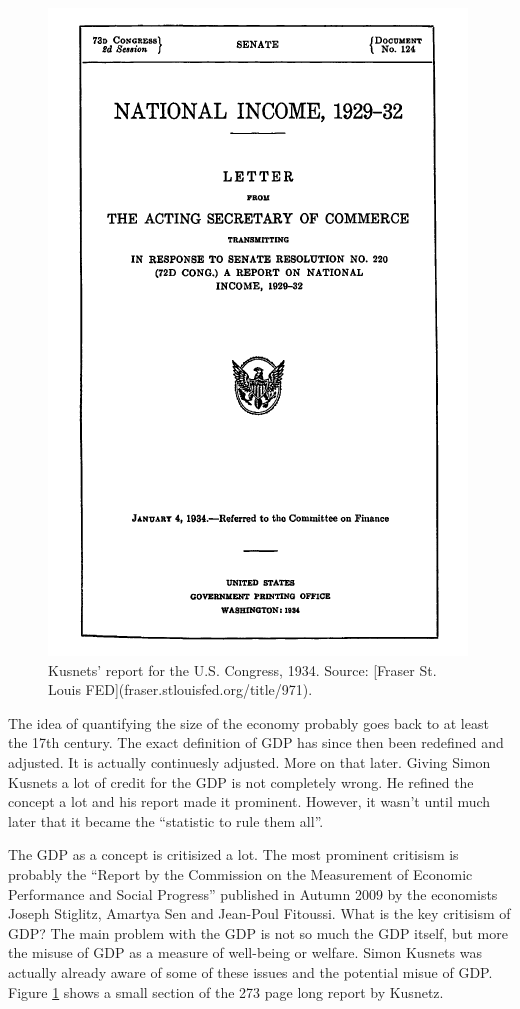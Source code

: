 \documentclass[]{book}
\begin{document}
\begin{figure}

{\centering \includegraphics[width=0.65\linewidth]{_resources/chapter_gdp/kusnetz} 

}

\caption{Kusnets' report for the U.S. Congress, 1934. Source:  [Fraser St. Louis FED](fraser.stlouisfed.org/title/971).}\label{fig:gdp1}
\end{figure}

The idea of quantifying the size of the economy probably goes back to at least the 17th century. The exact definition of GDP has since then been redefined and adjusted. It is actually continuesly adjusted. More on that later. Giving Simon Kusnets a lot of credit for the GDP is not completely wrong. He refined the concept a lot and his report made it prominent. However, it wasn't until much later that it became the ``statistic to rule them all''.

The GDP as a concept is critisized a lot. The most prominent critisism is probably the ``Report by the Commission on the Measurement of Economic Performance and Social Progress'' published in Autumn 2009 by the economists Joseph Stiglitz, Amartya Sen and Jean-Poul Fitoussi. What is the key critisism of GDP? The main problem with the GDP is not so much the GDP itself, but more the misuse of GDP as a measure of well-being or welfare. Simon Kusnets was actually already aware of some of these issues and the potential misue of GDP. Figure \ref{fig:gdp1} shows a small section of the 273 page long report by Kusnetz.
\end{document}
